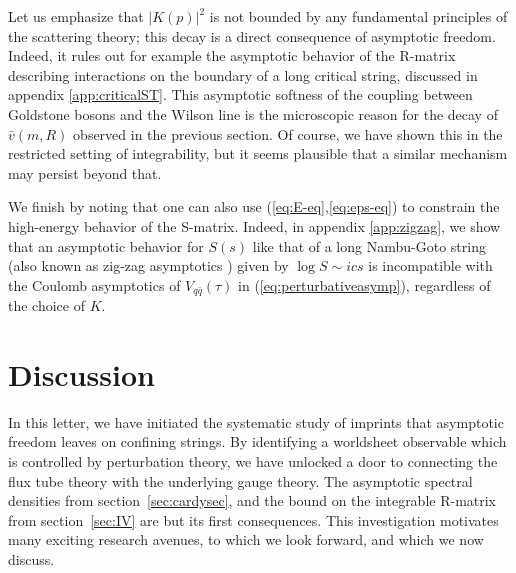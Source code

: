 \documentclass[
 reprint,
 amsmath,
 pre,
 amssymb,
 nofootinbib,
 aps,
 longbibliography,
]{revtex4-1}
\newcommand{\<}{{\langle}}
\renewcommand{\>}{{\rangle}}
\begin{document}
Let us emphasize that $|K(p)|^2$ is not bounded by any fundamental principles of the scattering theory; this decay is a direct consequence of asymptotic freedom. Indeed, it rules out for example the asymptotic behavior of the R-matrix describing interactions on the boundary of a long critical string, discussed in appendix \ref{app:criticalST}. This asymptotic softness of the coupling between Goldstone bosons and the Wilson line is the microscopic reason for the decay of $\bar v( m,R)$ observed in the previous section. Of course, we have shown this in the restricted setting of integrability, but it seems plausible that a similar mechanism may persist beyond that.

We finish by noting that one can also use (\ref{eq:E-eq},\ref{eq:eps-eq}) to constrain the high-energy behavior of the S-matrix. Indeed, in appendix \ref{app:zigzag}, we show that an asymptotic behavior for $S(s)$ like that of a long Nambu-Goto string \cite{Dubovsky:2012sh} (also known as zig-zag asymptotics \cite{Dubovsky_2018}) given by $\log S \sim i c s$ is incompatible with the Coulomb asymptotics of $V_{q\bar{q}}(\tau)$ in (\ref{eq:perturbativeasymp}), regardless of the choice of $K$.

\section{Discussion}\label{sec:discussion}
\label{sec:V}

In this letter, we have initiated the systematic study of imprints that asymptotic freedom leaves on confining strings. By identifying a worldsheet observable which is controlled by perturbation theory, we have unlocked a door to connecting the flux tube theory with the underlying gauge theory. The asymptotic spectral densities from section~\ref{sec:cardysec}, and the bound on the integrable R-matrix from section~\ref{sec:IV} are but its first consequences. This investigation motivates many exciting research avenues, to which we look forward, and which we now discuss.

\vspace{-15pt}
\end{document}
